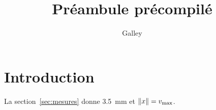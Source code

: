 \documentclass[11pt]{article}
\title{Préambule précompilé}
\author{Galley}
\begin{document}
\maketitle
\section{Introduction}\label{sec:intro}
La section~\ref{sec:mesures} donne \SI{3.5}{\milli\metre} et $\left\lVert x \right\rVert = v_{\mathrm{max}}$.

\end{document}
